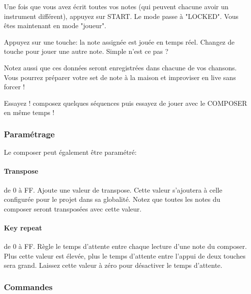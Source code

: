 \documentclass[12pt,a4paper]{article}
\begin{document}
    Une fois que vous avez écrit toutes vos notes (qui peuvent chacune avoir un instrument différent), appuyez sur START.
    Le mode passe à "LOCKED". Vous êtes maintenant en mode "joueur".
    \medskip
    
    Appuyez sur une touche: la note assignée est jouée en temps réel.
    Changez de touche pour jouer une autre note. Simple n'est ce pas ?
    \medskip
    
    Notez aussi que ces données seront enregistrées dans chacune de vos chansons.
    Vous pourrez préparer votre set de note à la maison et improviser en live sans forcer !
    \medskip
    
    Essayez ! composez quelques séquences puis essayez de jouer avec le COMPOSER en même temps !
    \medskip
    
    \subsubsection{Paramétrage}
    
    Le composer peut également être paramétré:
    
    
    \paragraph{Transpose} de 0 à FF.
    Ajoute une valeur de transpose.
    Cette valeur s'ajoutera à celle configurée pour le projet dans sa globalité.
    Notez que toutes les notes du composer seront transposées avec cette valeur.

    \paragraph{Key repeat} de 0 à FF.
    Règle le temps d'attente entre chaque lecture d'une note du composer.
    Plus cette valeur est élevée, plus le temps d'attente entre l'appui de deux touches sera grand.
    Laissez cette valeur à zéro pour désactiver le temps d'attente.

    \subsubsection{Commandes}
\end{document}
